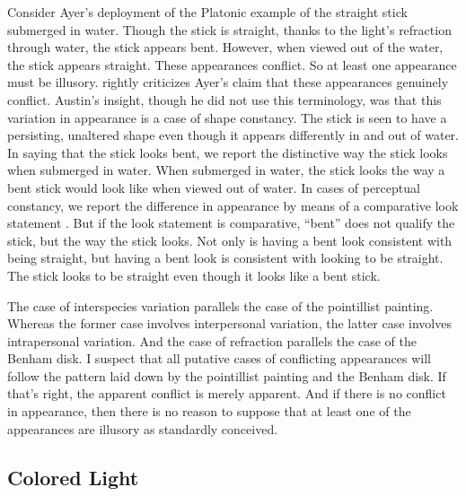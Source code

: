 \documentclass[12pt]{article}
\begin{document}
Consider Ayer's deployment of the Platonic example of the straight stick submerged in water. Though the stick is straight, thanks to the light's refraction through water, the stick appears bent. However, when viewed out of the water, the stick appears straight. These appearances conflict. So at least one appearance must be illusory. \citet{Austin:1962lr} rightly criticizes Ayer's claim that these appearances genuinely conflict. Austin's insight, though he did not use this terminology, was that this variation in appearance is a case of shape constancy. The stick is seen to have a persisting, unaltered shape even though it appears differently in and out of water. In saying that the stick looks bent, we report the distinctive way the stick looks when submerged in water. When submerged in water, the stick looks the way a bent stick would look like when viewed out of water. In cases of perceptual constancy, we report the difference in appearance by means of a comparative look statement \citep[see][48]{Chisholm:1957dq}. But if the look statement is comparative, ``bent'' does not qualify the stick, but the way the stick looks. Not only is having a bent look consistent with being straight, but having a bent look is consistent with looking to be straight. The stick looks to be straight even though it looks like a bent stick.

The case of interspecies variation parallels the case of the pointillist painting. Whereas the former case involves interpersonal variation, the latter case involves intrapersonal variation. And the case of refraction parallels the case of the Benham disk. I suspect that all putative cases of conflicting appearances will follow the pattern laid down by the pointillist painting and the Benham disk. If that's right, the apparent conflict is merely apparent. And if there is no conflict in appearance, then there is no reason to suppose that at least one of the appearances are illusory as standardly conceived.



\subsection{Colored Light}\label{sub:colored_illuminants} %
\end{document}
